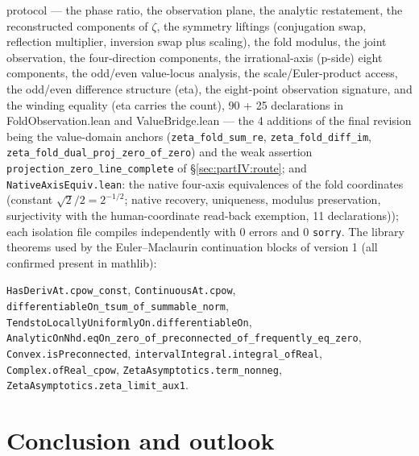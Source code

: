 \documentclass{article}
\newcommand{\zt}{\zeta}
\begin{document}
protocol --- the phase ratio, the observation plane, the analytic
restatement, the reconstructed components of $\zt$, the symmetry
liftings (conjugation swap, reflection multiplier, inversion swap
plus scaling), the fold modulus, the joint observation, the
four-direction components, the irrational-axis (p-side) eight
components, the odd/even value-locus analysis, the scale/Euler-product
access, the odd/even difference structure (eta), the
eight-point observation signature, and the winding equality
(eta carries the count), 90 + 25 declarations in
FoldObservation.lean and ValueBridge.lean --- the 4 additions of the
final revision being the value-domain anchors
(\texttt{zeta\_fold\_sum\_re}, \texttt{zeta\_fold\_diff\_im},
\texttt{zeta\_fold\_dual\_proj\_zero\_of\_zero}) and the weak
assertion \texttt{projection\_zero\_line\_complete} of
\S\ref{sec:partIV:route}; and \texttt{NativeAxisEquiv.lean}: the native
four-axis equivalences of the fold coordinates (constant
$\sqrt2/2=2^{-1/2}$; native recovery, uniqueness, modulus
preservation, surjectivity with the human-coordinate read-back
exemption, 11 declarations));
each isolation file
compiles independently with
0 errors and 0 \texttt{sorry}. The library theorems used by the Euler--Maclaurin
continuation blocks of version 1 (all confirmed present in mathlib):
{\small\begin{sloppypar}\texttt{HasDerivAt.cpow\_const},
\texttt{ContinuousAt.cpow}, \texttt{differentiableOn\_tsum\_of\_summable\_norm},
\texttt{TendstoLocallyUniformlyOn.differentiableOn},
\texttt{AnalyticOnNhd.eqOn\_zero\_of\_preconnected\_of\_frequently\_eq\_zero},
\texttt{Convex.isPreconnected}, \texttt{intervalIntegral.integral\_ofReal},
\texttt{Complex.ofReal\_cpow}, \texttt{ZetaAsymptotics.term\_nonneg},
\texttt{ZetaAsymptotics.zeta\_limit\_aux1}.\end{sloppypar}}

\section{Conclusion and outlook}
\label{sec:conclusion}
\end{document}
